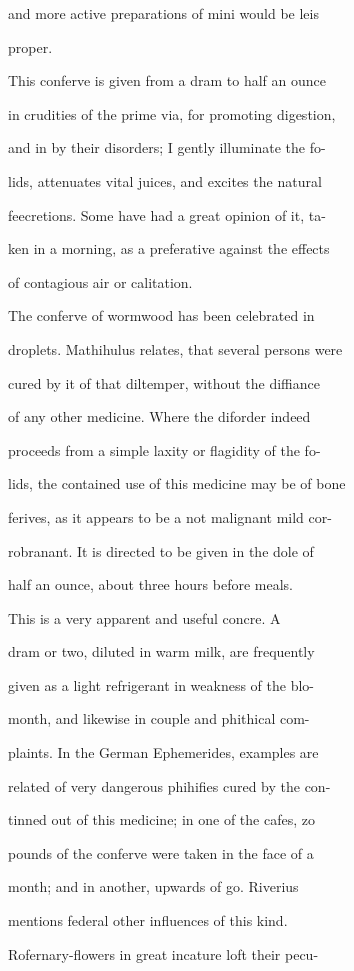 \documentclass{article}
\begin{document}
and more active preparations of mini would be leis

proper.

This conferve is given from a dram to half an ounce

in crudities of the prime via, for promoting digestion,

and in by their disorders; I gently illuminate the fo-

lids, attenuates vital juices, and excites the natural

feecretions. Some have had a great opinion of it, ta-

ken in a morning, as a preferative against the effects

of contagious air or calitation.

The conferve of wormwood has been celebrated in

droplets. Mathihulus relates, that several persons were

cured by it of that diltemper, without the diffiance

of any other medicine. Where the diforder indeed

proceeds from a simple laxity or flagidity of the fo-

lids, the contained use of this medicine may be of bone

ferives, as it appears to be a not malignant mild cor-

robranant. It is directed to be given in the dole of

half an ounce, about three hours before meals.

This is a very apparent and useful concre. A

dram or two, diluted in warm milk, are frequently

given as a light refrigerant in weakness of the blo-

month, and likewise in couple and phithical com-

plaints. In the German Ephemerides, examples are

related of very dangerous phihifies cured by the con-

tinned out of this medicine; in one of the cafes, zo

pounds of the conferve were taken in the face of a

month; and in another, upwards of go. Riverius

mentions federal other influences of this kind.

Rofernary-flowers in great incature loft their pecu-
\end{document}
